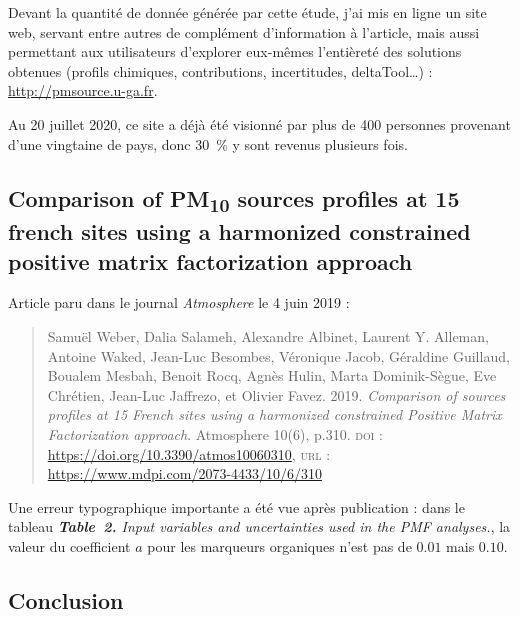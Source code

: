 \begin{tcolorbox}[colback=red!5!white,colframe=Melon,title=Note]
    Devant la quantité de donnée générée par cette étude, j'ai mis en ligne un site web,
    servant entre autres de complément d'information à l'article, mais aussi permettant aux
    utilisateurs d'explorer eux-mêmes l'entièreté des solutions obtenues (profils
    chimiques, contributions, incertitudes, deltaTool…) : \url{http://pmsource.u-ga.fr}.

    Au 20 juillet 2020, ce site a déjà été visionné par plus de 400 personnes provenant
    d'une vingtaine de pays, donc \SI{30}{\percent} y sont revenus plusieurs fois.
\end{tcolorbox}

\subsection{Comparison of PM\textsubscript{10} sources profiles at 15 french sites using a harmonized constrained positive matrix factorization approach}%
\label{sub:article_SOURCES}

\begin{tcolorbox}[colback=red!5!white,colframe=Melon,title=Note]
Article paru dans le journal \textit{Atmosphere} le 4 juin 2019 :
\begin{quote}
    Samuël Weber, Dalia Salameh, Alexandre Albinet, Laurent Y. Alleman, Antoine Waked,
    Jean-Luc Besombes, Véronique Jacob, Géraldine Guillaud, Boualem Mesbah, Benoit Rocq, Agnès
    Hulin, Marta Dominik-Sègue, Eve Chrétien, Jean-Luc Jaffrezo, et Olivier Favez. 2019.
    \textit{Comparison of \PMdix{} sources profiles at 15 French sites using a harmonized constrained
    Positive Matrix Factorization approach}. Atmosphere 10(6), p.310.
    \textsc{doi} : \href{doi:10.3390/atmos10060310}{https://doi.org/10.3390/atmos10060310},
    \textsc{url} : \url{https://www.mdpi.com/2073-4433/10/6/310}
\end{quote}
\end{tcolorbox}


Une erreur typographique importante a été vue après publication : dans le tableau 
\textit{\textbf{Table~2.} Input variables and uncertainties used in the PMF analyses.}, la
valeur du coefficient $a$ pour les marqueurs organiques n'est pas de $0.01$ mais $0.10$.




\subsection{Conclusion}%
\label{sub:conclusion_SOURCES}

